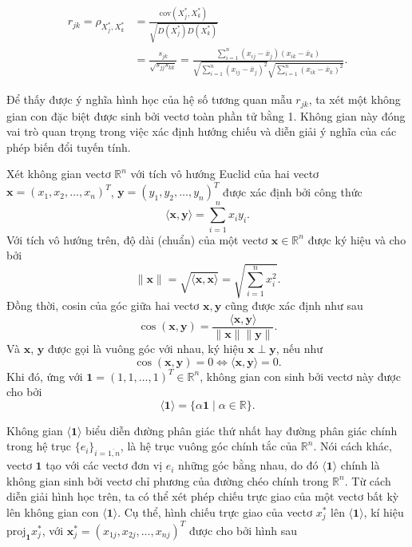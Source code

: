 \begin{equation}
	\begin{aligned}
		r_{jk}=\rho_{X_j^*, X_k^*} &= \frac{\text{cov}(X_j^*, X_k^*)}{\sqrt{D(X_j^*)D(X_k^*)}} \\
		&= \frac{s_{jk}}{\sqrt{s_{jj} s_{kk}}} = \frac{\sum_{i=1}^n (x_{ij} - \overline{x}_j)(x_{ik} - \overline{x}_k)}{\sqrt{\sum_{i=1}^n (x_{ij} - \overline{x}_j)^2} \sqrt{\sum_{i=1}^n (x_{ik} - \overline{x}_k)^2}} .
	\end{aligned}
	\label{eq:1.8}
\end{equation}

\hspace*{0.5cm}Để thấy được ý nghĩa hình học của hệ số tương quan mẫu $r_{jk}$, ta xét một không gian con đặc biệt được sinh bởi vectơ toàn phần tử bằng 1. Không gian này đóng vai trò quan trọng trong việc xác định hướng chiếu và diễn giải ý nghĩa của các phép biến đổi tuyến tính.

Xét không gian vectơ $\mathbb{R}^n$ với tích vô hướng Euclid của hai vectơ $\bm{x} = (x_1, x_2,\dots,x_n)^T$, $\bm{y} = (y_1, y_2,\dots,y_n)^T$ được xác định bởi công thức
$$
\langle \bm{x}, \bm{y} \rangle = \sum_{i=1}^n x_i y_i.
$$
Với tích vô hướng trên, độ dài (chuẩn) của một vectơ $\bm{x} \in \mathbb{R}^n$ được ký hiệu và cho bởi
$$
\|\bm{x}\| = \sqrt{\langle \bm{x}, \bm{x} \rangle} = \sqrt{\sum_{i=1}^n x_i^2}.
$$
Đồng thời, cosin của góc giữa hai vectơ $\bm{x}, \bm{y}$ cũng được xác định như sau
$$
\cos(\bm{x}, \bm{y}) = \frac{\langle \bm{x}, \bm{y} \rangle}{\|\bm{x}\| \|\bm{y}\|}.
$$
Và $\bm{x}$, $\bm{y}$ được gọi là vuông góc với nhau, ký hiệu $\bm{x} \perp \bm{y}$, nếu như 
$$
\cos(\bm{x}, \bm{y}) = 0 \iff \langle \bm{x}, \bm{y} \rangle = 0.
$$
Khi đó, ứng với $\mathbf{1} = (1, 1,\dots,1)^T \in \mathbb{R}^n$, không gian con sinh bởi vectơ này được cho bởi
$$
\langle \mathbf{1} \rangle = \{\alpha \mathbf{1} \mid \alpha \in \mathbb{R}\}.
$$

Không gian $\langle \mathbf{1} \rangle$ biểu diễn đường phân giác thứ nhất hay đường phân giác chính trong hệ trục $\{e_i\}_{i=\overline{1,n}}$, là hệ trục vuông góc chính tắc của $\mathbb{R}^n$. Nói cách khác, vectơ $\mathbf{1}$ tạo với các vectơ đơn vị $e_i$ những góc bằng nhau, do đó $\langle \mathbf{1} \rangle$ chính là không gian sinh bởi vectơ chỉ phương của đường chéo chính trong $\mathbb{R}^n$. Từ cách diễn giải hình học trên, ta có thể xét phép chiếu trực giao của một vectơ bất kỳ lên không gian con $\langle \mathbf{1} \rangle$. Cụ thể, hình chiếu trực giao của vectơ $x_j^*$ lên $\langle \mathbf{1} \rangle$, kí hiệu $\text{proj}_{\mathbf{1}} x_j^*$, với $\bm{x}_j^* = (x_{1j},x_{2j},\dots,x_{nj})^T$ được cho bởi hình sau

